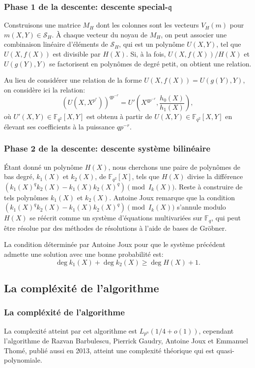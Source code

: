 \documentclass{beamer}
\theoremstyle{definition}
\theoremstyle{remark}
\def\o{o}
\def\gf #1{\mathbb{F}_{#1}}
\begin{document}
\begin{frame}
  \frametitle{Phase 1 de la descente: descente special-$\mathfrak{q}$}
   Construisons une matrice $M_H$ dont les colonnes sont les vecteurs $V_H(m)$ pour $m(X,Y) \in \mathcal S_H$. À chaque vecteur du noyau de $M_H$, on peut associer une combinaison linéaire d'éléments de $\mathcal S_H$, qui est un polynôme $U(X,Y)$, tel que $U(X,f(X))$ est divisible par $H(X)$. Si, à la fois, $U(X,f(X))/H(X)$ et $U(g(Y),Y)$ se factorisent en polynômes de degré petit, on obtient une relation.

  Au lieu de considérer une relation de la forme $U(X,f(X)) = U(g(Y),Y)$, on considère ici la relation:
$${\left({U(X,X^{p^r})}\right)}^{qp^{-r}} = U'\left( X^{qp^{-r}},\frac{h_0(X)}{h_1(X)}\right),$$
où $U'(X,Y) \in \gf{q^2}[X,Y]$ est obtenu à partir de $U(X,Y)\in \gf{q^2}[X,Y]$ en élevant ses coefficients à la puissance $qp^{-r}$.
\end{frame}

\begin{frame}
  \frametitle{Phase 2 de la descente: descente système bilinéaire}
  Étant donné un polynôme $H(X)$, nous cherchons une paire de polynômes de bas degré, $k_1(X)$ et $k_2(X)$, de $\gf{q^2}[X]$, tels que $H(X)$ divise la différence $(k_1(X)^qk_2(X)-k_1(X)k_2(X)^q) \pmod{I_k(X)}$.
  Reste à construire de tels polynômes $k_1(X)$ et $k_2(X)$. Antoine Joux remarque que la condition $(k_1(X)^qk_2(X)-k_1(X)k_2(X)^q) \pmod{I_k(X)}$ s'annule modulo $H(X)$ se réécrit comme un système d'équations multivariées sur $\gf{q}$, qui peut être résolue par des méthodes de résolutions à l'aide de bases de Gröbner.

  La condition déterminée par Antoine Joux pour que le système précédent admette une solution avec une bonne probabilité est:
$$\deg k_1(X) + \deg k_2(X) \geqslant \deg H(X) + 1.$$
\end{frame}

\subsection{La compléxité de l'algorithme}
\begin{frame}
  \frametitle{La compléxité de l'algorithme}
  La complexité atteint par cet algorithme est $L_{p^n}(1/4+\o(1))$, cependant l'algorithme de Razvan Barbulescu, Pierrick Gaudry, Antoine Joux et Emmanuel Thomé, publié aussi en 2013, atteint une complexité théorique qui est quasi-polynomiale.
\end{frame}
\end{document}
